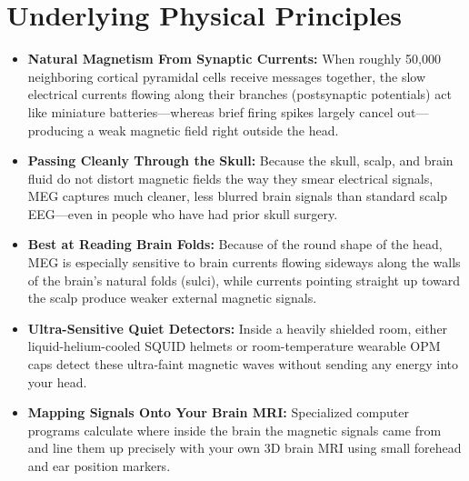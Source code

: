 \section{Underlying Physical Principles}
\begin{itemize}
  \item \textbf{Natural Magnetism From Synaptic Currents:} When roughly 50,000 neighboring cortical pyramidal cells receive messages together, the slow electrical currents flowing along their branches (postsynaptic potentials) act like miniature batteries---whereas brief firing spikes largely cancel out---producing a weak magnetic field right outside the head.
  \item \textbf{Passing Cleanly Through the Skull:} Because the skull, scalp, and brain fluid do not distort magnetic fields the way they smear electrical signals, MEG captures much cleaner, less blurred brain signals than standard scalp EEG---even in people who have had prior skull surgery.
  \item \textbf{Best at Reading Brain Folds:} Because of the round shape of the head, MEG is especially sensitive to brain currents flowing sideways along the walls of the brain's natural folds (sulci), while currents pointing straight up toward the scalp produce weaker external magnetic signals.
  \item \textbf{Ultra-Sensitive Quiet Detectors:} Inside a heavily shielded room, either liquid-helium-cooled SQUID helmets or room-temperature wearable OPM caps detect these ultra-faint magnetic waves without sending any energy into your head.
  \item \textbf{Mapping Signals Onto Your Brain MRI:} Specialized computer programs calculate where inside the brain the magnetic signals came from and line them up precisely with your own 3D brain MRI using small forehead and ear position markers.
\end{itemize}

